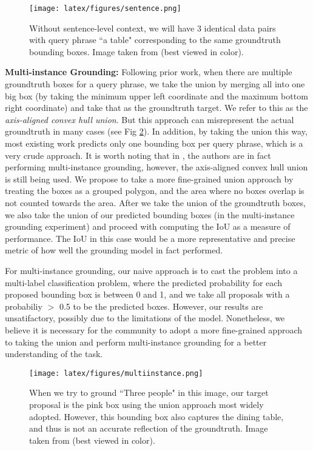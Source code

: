 \begin{figure}[t]
\texttt{[image: latex/figures/sentence.png]}
\caption{Without sentence-level context, we will have 3 identical data pairs with query phrase ``a table" corresponding to the same groundtruth bounding boxes. Image taken from \cite{plummer2015flickr30k}  (best viewed in color).}
\label{fig: sentence}
\centering
\end{figure}

\textbf{Multi-instance Grounding: }
Following prior work, when there are multiple groundtruth boxes for a query phrase, we take the union by merging all into one big box (by taking the minimum upper left coordinate and the maximum bottom right coordinate) and take that as the groundtruth target. We refer to this as the \textit{axis-aligned convex hull union}. But this approach can misrepresent the actual groundtruth in many cases (see Fig \ref{fig: multiinstance}). In addition, by taking the union this way, most existing work predicts only one bounding box per query phrase, which is a very crude approach. It is worth noting that in \cite{dogan2019neural}, the authors are in fact performing multi-instance grounding, however, the axis-aligned convex hull union is still being used. We propose to take a more fine-grained union approach by treating the boxes as a grouped polygon, and the area where no boxes overlap is not counted towards the area. After we take the union of the groundtruth boxes, we also take the union of our predicted bounding boxes (in the multi-instance grounding experiment) and proceed with computing the IoU as a measure of performance. The IoU in this case would be a more representative and precise metric of how well the grounding model in fact performed. 

For multi-instance grounding, our naive approach is to cast the problem into a multi-label classification problem, where the predicted probability for each proposed bounding box is between 0 and 1, and we take all proposals with a probabiliy $>$ 0.5 to be the predicted boxes. However, our results are unsatifactory, possibly due to the limitations of the model. Nonetheless, we believe it is necessary for the community to adopt a more fine-grained approach to taking the union and perform multi-instance grounding for a better understanding of the task. 


\begin{figure}[t]
\texttt{[image: latex/figures/multiinstance.png]}
\caption{When we try to ground ``Three people" in this image, our target proposal is the pink box using the union approach most widely adopted. However, this bounding box also captures the dining table, and thus is not an accurate reflection of the groundtruth. Image taken from \cite{plummer2015flickr30k}  (best viewed in color).}
\label{fig: multiinstance}
\centering
\end{figure}
